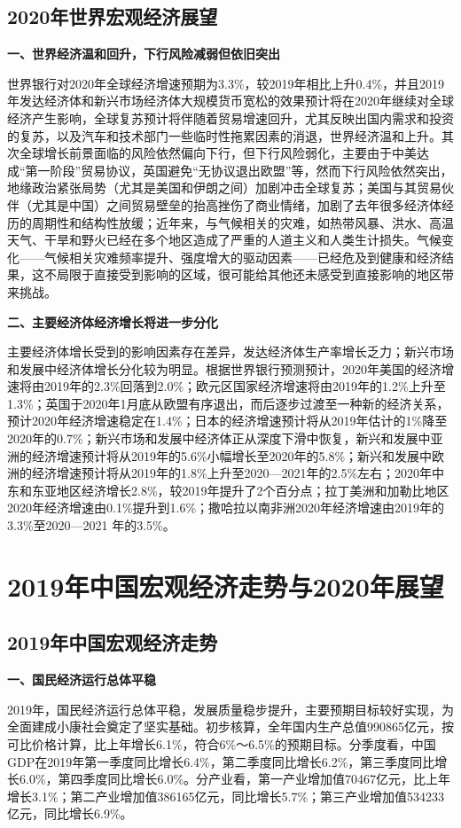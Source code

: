 \documentclass{progbookcn}
\begin{document}
\subsection{2020年世界宏观经济展望}
\textbf{一、世界经济温和回升，下行风险减弱但依旧突出}

世界银行对2020年全球经济增速预期为3.3\%，较2019年相比上升0.4\%，并且2019年发达经济体和新兴市场经济体大规模货币宽松的效果预计将在2020年继续对全球经济产生影响，全球复苏预计将伴随着贸易增速回升，尤其反映出国内需求和投资的复苏，以及汽车和技术部门一些临时性拖累因素的消退，世界经济温和上升。其次全球增长前景面临的风险依然偏向下行，但下行风险弱化，主要由于中美达成“第一阶段”贸易协议，英国避免“无协议退出欧盟”等，然而下行风险依然突出，地缘政治紧张局势（尤其是美国和伊朗之间）加剧冲击全球复苏；美国与其贸易伙伴（尤其是中国）之间贸易壁垒的抬高挫伤了商业情绪，加剧了去年很多经济体经历的周期性和结构性放缓；近年来，与气候相关的灾难，如热带风暴、洪水、高温天气、干旱和野火已经在多个地区造成了严重的人道主义和人类生计损失。气候变化——气候相关灾难频率提升、强度增大的驱动因素——已经危及到健康和经济结果，这不局限于直接受到影响的区域，很可能给其他还未感受到直接影响的地区带来挑战。

\textbf{二、主要经济体经济增长将进一步分化}

主要经济体增长受到的影响因素存在差异，发达经济体生产率增长乏力；新兴市场和发展中经济体增长分化较为明显。根据世界银行预测预计，2020年美国的经济增速将由2019年的2.3\%回落到2.0\%；欧元区国家经济增速将由2019年的1.2\%上升至1.3\%；英国于2020年1月底从欧盟有序退出，而后逐步过渡至一种新的经济关系，预计2020年经济增速稳定在1.4\%；日本的经济增速预计将从2019年估计的1\%降至2020年的0.7\%；新兴市场和发展中经济体正从深度下滑中恢复，新兴和发展中亚洲的经济增速预计将从2019年的5.6\%小幅增长至2020年的5.8\%；新兴和发展中欧洲的经济增速预计将从2019年的1.8\%上升至2020—2021年的2.5\%左右；2020年中东和东亚地区经济增长2.8\%，较2019年提升了2个百分点；拉丁美洲和加勒比地区2020年经济增速由0.1\%提升到1.6\%；撒哈拉以南非洲2020年经济增速由2019年的3.3\%至2020—2021 年的3.5\%。

\section{2019年中国宏观经济走势与2020年展望}
\subsection{2019年中国宏观经济走势}
\textbf{一、国民经济运行总体平稳}

2019年，国民经济运行总体平稳，发展质量稳步提升，主要预期目标较好实现，为全面建成小康社会奠定了坚实基础。初步核算，全年国内生产总值990865亿元，按可比价格计算，比上年增长6.1\%，符合6\%～6.5\%的预期目标。分季度看，中国GDP在2019年第一季度同比增长6.4\%，第二季度同比增长6.2\%，第三季度同比增长6.0\%，第四季度同比增长6.0\%。分产业看，第一产业增加值70467亿元，比上年增长3.1\%；第二产业增加值386165亿元，同比增长5.7\%；第三产业增加值534233亿元，同比增长6.9\%。
\end{document}

